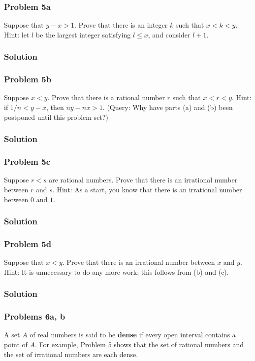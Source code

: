 \subsubsection*{Problem 5a}
Suppose that $y-x>1$. Prove that there is an integer $k$ such that
$x<k<y$. Hint: let $l$ be the largest integer satisfying $l\leq x$, and
consider $l+1$.

\subsubsection*{Solution}

\subsubsection*{Problem 5b}
Suppose $x<y$. Prove that there is a rational number $r$ such that
$x<r<y$. Hint: if $1/n<y-x$, then $ny-nx>1$. (Query: Why have parts
(a) and (b) been postponed until this problem set?)

\subsubsection*{Solution}

\subsubsection*{Problem 5c}
Suppose $r<s$ are rational numbers. Prove that there is an irrational
number between $r$ and $s$. Hint: As a start, you know that there is
an irrational number between $0$ and $1$.

\subsubsection*{Solution}

\subsubsection*{Problem 5d}
Suppose that $x<y$. Prove that there is an irrational number between
$x$ and $y$. Hint: It is unnecessary to do any more work; this follows
from (b) and (c).

\subsubsection*{Solution}

\subsubsection*{Problems 6a, b}
A set $A$ of real numbers is said to be \textbf{dense} if every open
interval contains a point of $A$. For example, Problem 5 shows that
the set of rational numbers and the set of irrational numbers are each
dense.

